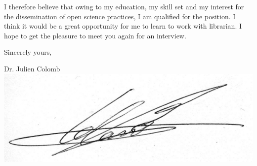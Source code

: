 I therefore believe that owing to my education, my skill set and my interest for the dissemination of open science practices, I am qualified for the position. I think it would be a great opportunity for me to learn to work with librarian. I hope to get the pleasure to meet you again for an interview.
 
Sincerely yours,\\

\hspace*{0.5\linewidth}
\begin{minipage}{0.3\linewidth}

Dr. Julien Colomb\\
\includegraphics[height=2\baselineskip]{Figures/signature.jpg}
\end{minipage}





